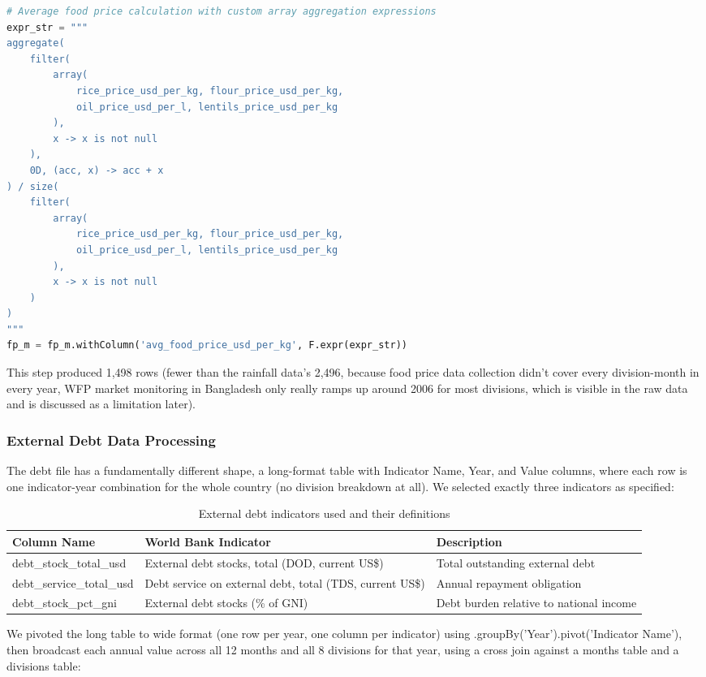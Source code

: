 \documentclass[12pt,a4paper]{article}
\begin{document}
\begin{lstlisting}[language=Python]
# Average food price calculation with custom array aggregation expressions
expr_str = """
aggregate(
    filter(
        array(
            rice_price_usd_per_kg, flour_price_usd_per_kg, 
            oil_price_usd_per_l, lentils_price_usd_per_kg
        ),
        x -> x is not null
    ),
    0D, (acc, x) -> acc + x
) / size(
    filter(
        array(
            rice_price_usd_per_kg, flour_price_usd_per_kg, 
            oil_price_usd_per_l, lentils_price_usd_per_kg
        ),
        x -> x is not null
    )
)
"""
fp_m = fp_m.withColumn('avg_food_price_usd_per_kg', F.expr(expr_str))
\end{lstlisting}

This step produced 1,498 rows (fewer than the rainfall data's 2,496, because food price data collection didn't cover every division-month in every year, WFP market monitoring in Bangladesh only really ramps up around 2006 for most divisions, which is visible in the raw data and is discussed as a limitation later).


\subsubsection{External Debt Data Processing}

The debt file has a fundamentally different shape, a long-format table with Indicator Name, Year, and Value columns, where each row is one indicator-year combination for the whole country (no division breakdown at all). We selected exactly three indicators as specified:
\begin{table}[H]
\centering
\begin{spacing}{1.15}
\caption{External debt indicators used and their definitions}
\label{tab:debtindicators}
\begin{tabularx}{\textwidth}{llX}
\toprule
\textbf{Column Name} & \textbf{World Bank Indicator} & \textbf{Description} \\
\midrule
debt\_stock\_total\_usd   & External debt stocks, total (DOD, current US\$)         & Total outstanding external debt \\
debt\_service\_total\_usd & Debt service on external debt, total (TDS, current US\$) & Annual repayment obligation \\
debt\_stock\_pct\_gni     & External debt stocks (\% of GNI)                         & Debt burden relative to national income \\
\bottomrule
\end{tabularx}
\end{spacing}
\end{table}
We pivoted the long table to wide format (one row per year, one column per indicator) using .groupBy('Year').pivot('Indicator Name'), then broadcast each annual value across all 12 months and all 8 divisions for that year, using a cross join against a months table and a divisions table:
\end{document}
